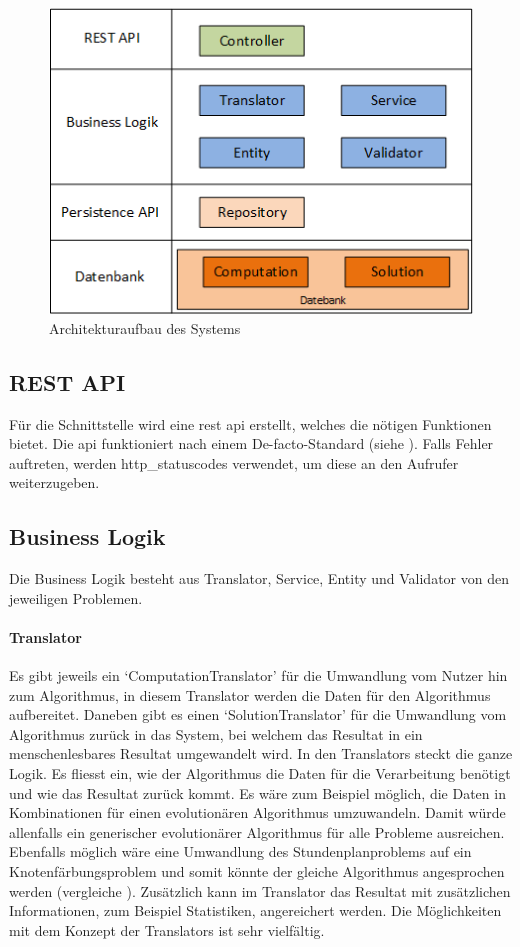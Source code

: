 \begin{figure}[h]
\centering
\includegraphics[scale=0.8]{images/visio/architektur_db.png}
\caption[Architekturaufbau des Systems]{Architekturaufbau des Systems \selfmade{}}
\label{fig:architektur}
\end{figure}
 
\FloatBarrier
\subsection{REST API}
Für die Schnittstelle wird eine \gls{rest} \gls{api} erstellt, welches die nötigen Funktionen bietet. Die \gls{api} funktioniert nach einem De-facto-Standard 
(siehe \cite{wiki_restful}). Falls Fehler auftreten, werden \glspl{http_statuscode} verwendet, um diese an den Aufrufer weiterzugeben.

\subsection{Business Logik}
Die Business Logik besteht aus Translator, Service, Entity und Validator von den jeweiligen Problemen. 
\paragraph{Translator}
Es gibt jeweils ein `ComputationTranslator' für die Umwandlung vom Nutzer hin zum Algorithmus, in diesem Translator werden die Daten für den Algorithmus aufbereitet. Daneben gibt es einen 
`SolutionTranslator' für die Umwandlung vom Algorithmus zurück in das System, bei welchem das Resultat in ein menschenlesbares Resultat umgewandelt wird. In den Translators steckt die 
ganze Logik. Es fliesst ein, wie der Algorithmus die Daten für die Verarbeitung benötigt und wie das Resultat zurück kommt. Es wäre zum Beispiel möglich, die Daten in Kombinationen für einen 
evolutionären Algorithmus umzuwandeln. Damit würde allenfalls ein generischer evolutionärer Algorithmus für alle Probleme ausreichen. Ebenfalls möglich wäre eine Umwandlung des 
Stundenplanproblems auf ein Knotenfärbungsproblem und somit könnte der gleiche Algorithmus angesprochen werden (vergleiche \cite{timetabling_abdullah}).  Zusätzlich kann im Translator 
das Resultat mit zusätzlichen Informationen, zum Beispiel Statistiken, angereichert werden. Die Möglichkeiten mit dem Konzept der Translators ist sehr vielfältig.
